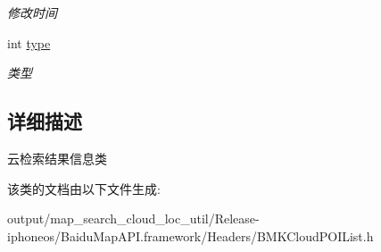 \begin{DoxyCompactItemize}
\begin{DoxyCompactList}\small\item\em 修改时间 \end{DoxyCompactList}\item 
\hypertarget{interface_b_m_k_cloud_p_o_i_info_a7a51645c4ec8dcfa08ae4624749878cb}{}int \hyperlink{interface_b_m_k_cloud_p_o_i_info_a7a51645c4ec8dcfa08ae4624749878cb}{type}\label{interface_b_m_k_cloud_p_o_i_info_a7a51645c4ec8dcfa08ae4624749878cb}

\begin{DoxyCompactList}\small\item\em 类型 \end{DoxyCompactList}\end{DoxyCompactItemize}


\subsection{详细描述}
云检索结果信息类 

该类的文档由以下文件生成\+:\begin{DoxyCompactItemize}
\item 
output/map\+\_\+search\+\_\+cloud\+\_\+loc\+\_\+util/\+Release-\/iphoneos/\+Baidu\+Map\+A\+P\+I.\+framework/\+Headers/B\+M\+K\+Cloud\+P\+O\+I\+List.\+h\end{DoxyCompactItemize}
